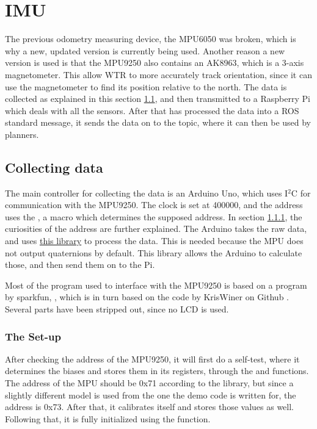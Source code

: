 \section{IMU}
\label{sec::IMU}
The previous odometry measuring device, the MPU6050 \cite{MPU6050} was broken, which is why a new, updated version is currently being used.
Another reason a new version is used is that the MPU9250 \cite{MPU9250} also contains an AK8963, which is a 3-axis magnetometer.
This allow WTR to more accurately track orientation, since it can use the magnetometer to find its position relative to the north.
The data is collected as explained in this section \ref{sec::collect}, and then transmitted to a Raspberry Pi which deals with all the sensors.
After that has processed the data into a ROS standard message, it sends the data on to the topic, where it can then be used by planners.

\subsection{Collecting data} \label{sec::collect}
The main controller for collecting the data is an Arduino Uno, which uses I$^{2}$C for communication with the MPU9250.
The clock is set at 400000, and the address uses the , a macro which determines the supposed address.
In section \ref{sec::set-up}, the curiosities of the address are further explained.
The Arduino takes the raw data, and uses \href{https://github.com/sparkfun/SparkFun_MPU-9250_Breakout_Arduino_Library}{this library} to process the data.
This is needed because the MPU does not output quaternions by default.
This library allows the Arduino to calculate those, and then send them on to the Pi.

Most of the program used to interface with the MPU9250 is based on a program by sparkfun, \cite{sparkfunMPU9250}, which is in turn based on the code by KrisWiner on Github \cite{kriswiner}.
Several parts have been stripped out, since no LCD is used.


\subsubsection{The Set-up} \label{sec::set-up}
After checking the address of the MPU9250, it will first do a self-test, where it determines the biases and stores them in its registers, through the  and  functions.
The address of the MPU should be 0x71 according to the library, but since a slightly different model is used from the one the demo code is written for, the address is 0x73.
After that, it calibrates itself and stores those values as well.
Following that, it is fully initialized using the  function.

